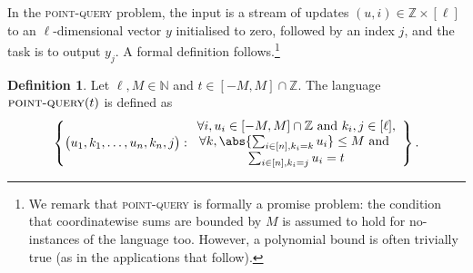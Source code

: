 \documentclass[a4paper,UKenglish,cleveref, autoref, thm-restate]{lipics-v2021}
\theoremstyle{definition}
\newtheorem{definition}[theorem]{Definition}
\newcommand{\N}{\mathbb N}
\newcommand{\Z}{\mathbb Z}
\renewcommand{\set}[1]{\left\{#1\right\}}
\newcommand{\pointquery}{\normalfont\textsc{point-query}\xspace}
\begin{document}
In the \pointquery problem, the input is a stream of updates $(u, i) \in \Z \times [\ell]$ to an $\ell$-dimensional vector $y$ initialised to zero, followed by an index $j$, and the task is to output $y_j$. A formal definition follows.\footnote{We remark that \pointquery is formally a promise problem: the condition that coordinatewise sums are bounded by $M$ is assumed to hold for no-instances of the language too. However, a polynomial bound is often trivially true (as in the applications that follow).}

\begin{definition}
    \label{def:point-query}
  Let $\ell, M \in \N$ and $t \in [-M, M] \cap \Z$. The language $\pointquery(t)$ is defined as
  \begin{equation*}
      \set{
          \big(u_1, k_1, \ldots, u_n, k_n, j\big)  : \begin{array}{c}
                \forall i, u_i \in [-M, M] \cap \Z \text{ and } k_i, j \in [\ell],\\
                \forall k, \abs{\sum_{i \in [n],  k_i = k} u_i} \leq M \text{ and }\\
                \sum_{i \in [n], k_i = j} u_i = t
          \end{array}
      }.
  \end{equation*}
\end{definition}
\end{document}
